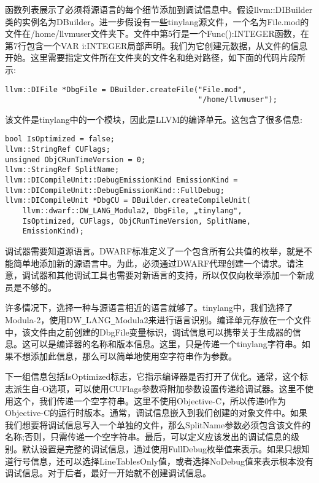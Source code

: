 函数列表展示了必须将源语言的每个细节添加到调试信息中。假设llvm::DIBuilder类的实例名为DBuilder。进一步假设有一些tinylang源文件，一个名为File.mod的文件在/home/llvmuser文件夹下。文件中第5行是一个Func():INTEGER函数，在第7行包含一个VAR i:INTEGER局部声明。我们为它创建元数据，从文件的信息开始。这里需要指定文件所在文件夹的文件名和绝对路径，如下面的代码片段所示:\par

\begin{lstlisting}[caption={}]
llvm::DIFile *DbgFile = DBuilder.createFile("File.mod",
											"/home/llvmuser");
\end{lstlisting}

该文件是tinylang中的一个模块，因此是LLVM的编译单元。这包含了很多信息:\par

\begin{lstlisting}[caption={}]
bool IsOptimized = false;
llvm::StringRef CUFlags;
unsigned ObjCRunTimeVersion = 0;
llvm::StringRef SplitName;
llvm::DICompileUnit::DebugEmissionKind EmissionKind =
llvm::DICompileUnit::DebugEmissionKind::FullDebug;
llvm::DICompileUnit *DbgCU = DBuilder.createCompileUnit(
	llvm::dwarf::DW_LANG_Modula2, DbgFile, „tinylang",
	IsOptimized, CUFlags, ObjCRunTimeVersion, SplitName,
	EmissionKind);
\end{lstlisting}

调试器需要知道源语言。DWARF标准定义了一个包含所有公共值的枚举，就是不能简单地添加新的源语言中。为此，必须通过DWARF代理创建一个请求。请注意，调试器和其他调试工具也需要对新语言的支持，所以仅仅向枚举添加一个新成员是不够的。\par

许多情况下，选择一种与源语言相近的语言就够了。tinylang中，我们选择了Modula-2，使用DW\underline{~}LANG\underline{~}Modula2来进行语言识别。编译单元存放在一个文件中，该文件由之前创建的DbgFile变量标识，调试信息可以携带关于生成器的信息。这可以是编译器的名称和版本信息。这里，只是传递一个tinylang字符串。如果不想添加此信息，那么可以简单地使用空字符串作为参数。\par

下一组信息包括IsOptimized标志，它指示编译器是否打开了优化。通常，这个标志派生自-O选项，可以使用CUFlags参数将附加参数设置传递给调试器。这里不使用这个，我们传递一个空字符串。这里不使用Objective-C，所以传递0作为Objective-C的运行时版本。通常，调试信息嵌入到我们创建的对象文件中。如果我们想要将调试信息写入一个单独的文件，那么SplitName参数必须包含该文件的名称;否则，只需传递一个空字符串。最后，可以定义应该发出的调试信息的级别。默认设置是完整的调试信息，通过使用FullDebug枚举值来表示。如果只想知道行号信息，还可以选择LineTablesOnly值，或者选择NoDebug值来表示根本没有调试信息。对于后者，最好一开始就不创建调试信息。\par

